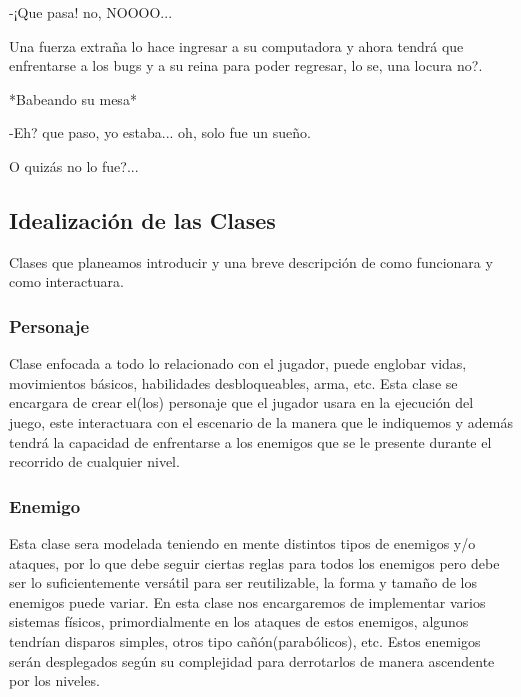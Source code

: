 \documentclass{article}
\begin{document}
        \begin{flushleft}
        -¡Que pasa! no, NOOOO...
        \end{flushleft}
        
        Una fuerza extraña lo hace ingresar a su computadora y ahora tendrá que enfrentarse a los bugs y a su reina para poder regresar, lo se, una locura no?.
         
        \begin{flushleft}
        
        *Babeando su mesa*
        \vspace{0.1cm}
        
        -Eh? que paso, yo estaba... oh, solo fue un sueño.
        \end{flushleft}
        
        O quizás no lo fue?...
        
        \subsection{Idealización de las Clases}
            Clases que planeamos introducir y una breve descripción de como funcionara y como interactuara.
            
            \subsubsection{Personaje}
            Clase enfocada a todo lo relacionado con el jugador, puede englobar vidas, movimientos básicos, habilidades desbloqueables, arma, etc. Esta clase se encargara de crear el(los) personaje que el jugador usara en la ejecución del juego, este interactuara con el escenario de la manera que le indiquemos y además tendrá la capacidad de enfrentarse a los enemigos que se le presente durante el recorrido de cualquier nivel.
            
            \subsubsection{Enemigo}
            Esta clase sera modelada teniendo en mente distintos tipos de enemigos y/o ataques, por lo que debe seguir ciertas reglas para todos los enemigos pero debe ser lo suficientemente versátil para ser reutilizable, la forma y tamaño de los enemigos puede variar. En esta clase nos encargaremos de implementar varios sistemas físicos, primordialmente en los ataques de estos enemigos, algunos tendrían disparos simples, otros tipo cañón(parabólicos), etc. Estos enemigos serán desplegados según su complejidad para derrotarlos de manera ascendente por los niveles.
            
\end{document}
